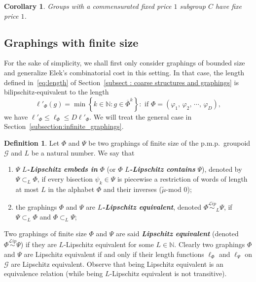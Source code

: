 \documentclass[10pt]{amsart}
\newtheorem{coro}[cdrthm]{Corollary}
\theoremstyle{definition}
\newtheorem{defi}[cdrthm]{Definition}
\newcommand{\defin}[1]{\textbf{\emph{#1}}}
\newcommand{\Nmath}{\mathbb{N}}
\newcommand{\cg}{\mathcal{G}}
\newcommand{\ph}{\varphi}
\newcommand{\pmp}{p.m.p.\ }
\newcommand\Lipeq{\overset{\mathcal{L}ip}{\sim}}
\begin{document}
\begin{coro}\label{cor: cost 1 commensurated}
Groups with a commensurated fixed price $1$ subgroup $C$ have fixe price $1$.
\end{coro}


\subsection{Graphings with finite size}\label{subsection:finite_graphings}


For the sake of simplicity, we shall first only consider graphings of bounded size and generalize Elek's combinatorial cost in this setting. In that case, the length defined in~\eqref{eq:length} of Section~\ref{subsect : coarse structures and graphings} is bilipschitz-equivalent to the length
\[
\ell'_\Phi(g) = \min\left\{k \in \Nmath: g \in \overline{\Phi}^k \right\}:\text{ if }\Phi = \left(\ph_1, \,\ph_2,\,\cdots,\,\ph_D\right),
\]
we have $\ell'_\Phi \leq \ell_\Phi \leq D \ell'_\Phi$. We will treat the general case in Section~\ref{subsection:infinite_graphings}.

\begin{defi}\label{def:Lipschitz-contain-equiv-graphins}
Let $\Phi$ and $\Psi$ be two graphings of finite size of the \pmp groupoid $\cg$ and $L$ be a natural number. We say that
\begin{enumerate}
\item \label{defi3.4.1}$\Psi$ \defin{$L$-Lipschitz embeds in} $\Phi$ (or $\Phi$
\defin{$L$-Lipschitz contains} $\Psi$), denoted by $\Psi\subset_L \Phi$, if every bisection $\psi_k\in\Psi$ is piecewise a restriction of words of length at most $L$ in the alphabet $\Phi$ and their inverses ($\widetilde{\mu}$-mod $0$);
\item \label{defi3.4.2}the graphings $\Phi$ and $\Psi$ are
\defin{$L$-Lipschitz equivalent}, denoted $\Phi\Lipeq_L\Psi$, if $\Psi\subset_L \Phi$ and $\Phi \subset_L \Psi$;
\end{enumerate}
\end{defi}

Two graphings of finite size $\Phi$ and $\Psi$ are said
\defin{Lipschitz equivalent} (denoted $\Phi\Lipeq\Psi$) if they are $L$-Lipschitz equivalent for some $L \in \Nmath$. Clearly two graphings $\Phi$ and $\Psi$ are Lipschitz equivalent if and only if their length functions $\ell_\Phi$ and $\ell_\Psi$ on $\cg$ are Lipschitz equivalent. Observe that being Lipschitz equivalent is an equivalence relation (while being $L$-Lipschitz equivalent is not transitive).
\end{document}
